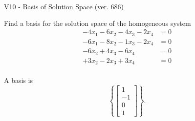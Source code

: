 \begin{exercise}
  \begin{exerciseTitle}V10 - Basis of Solution Space (ver. 686)\end{exerciseTitle}
  \begin{exerciseStatement}
    Find a basis for the solution space of the homogeneous system 
\begin{align*}
 -4 x_ 1 -6 x_ 2 -4 x_ 3 -2 x_ 4 &= 0  \\ 
  -6 x_ 1 -8 x_ 2 -1 x_ 3 -2 x_ 4 &= 0  \\ 
  -6 x_ 2 + 4 x_ 3 -6 x_ 4 &= 0  \\ 
  + 3 x_ 2 -2 x_ 3 + 3 x_ 4 &= 0  \\ 
 \end{align*}


 
  \end{exerciseStatement}

  \begin{exerciseAnswer}
   A basis is   
\[\left\{\left[\begin{array}{c}
1 \\
-1 \\
0 \\
1
\end{array}\right]\right\}.\]

  


  \end{exerciseAnswer}
\end{exercise}